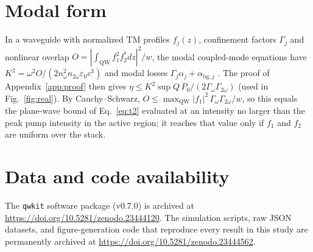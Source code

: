 \documentclass[11pt]{article}
\begin{document}
\section{Modal form}\label{app:modal}
In a waveguide with normalized TM profiles $f_j(z)$, confinement factors $\Gamma_j$ and nonlinear overlap $O=|\int_\mathrm{QW}f_1^2f_2^*dz|^2/w$, the modal coupled-mode equations have $K^2=\omega^2O/(2n_\omega^2n_{2\omega}\varepsilon_0c^3)$ and modal losses $\Gamma_j\alpha_j+\alpha_{\mathrm{bg},j}$ \cite{OwnbyN1}. The proof of Appendix~\ref{app:proof} then gives $\eta\le K^2\sup Q\,P_0/(2\Gamma_\omega\Gamma_{2\omega})$ (used in Fig.~\ref{fig:real}). By Cauchy--Schwarz, $O\le\max_\mathrm{QW}|f_1|^2\,\Gamma_\omega\Gamma_{2\omega}/w$, so this equals the plane-wave bound of Eq.~\eqref{eq:t2} evaluated at an intensity no larger than the peak pump intensity in the active region; it reaches that value only if $f_1$ and $f_2$ are uniform over the stack.

\section*{Data and code availability}
The \texttt{qwkit} software package (v0.7.0) is archived at \url{https://doi.org/10.5281/zenodo.23444120}. The simulation scripts, raw JSON datasets, and figure-generation code that reproduce every result in this study are permanently archived at \url{https://doi.org/10.5281/zenodo.23444562}.



\end{document}
